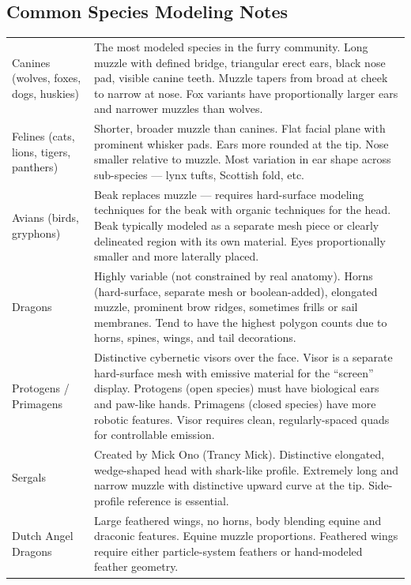 \subsection{Common Species Modeling Notes}
\label{subsec:species-notes}

\begin{center}
\begin{tabularx}{\textwidth}{L{3.2cm}X}
\toprule
{}
 &  \\
\midrule
Canines (wolves, foxes, dogs, huskies) & The most modeled species in the furry community. Long muzzle with defined bridge, triangular erect ears, black nose pad, visible canine teeth. Muzzle tapers from broad at cheek to narrow at nose. Fox variants have proportionally larger ears and narrower muzzles than wolves. \\
Felines (cats, lions, tigers, panthers) & Shorter, broader muzzle than canines. Flat facial plane with prominent whisker pads. Ears more rounded at the tip. Nose smaller relative to muzzle. Most variation in ear shape across sub-species --- lynx tufts, Scottish fold, etc. \\
Avians (birds, gryphons) & Beak replaces muzzle --- requires hard-surface modeling techniques for the beak with organic techniques for the head. Beak typically modeled as a separate mesh piece or clearly delineated region with its own material. Eyes proportionally smaller and more laterally placed. \\
Dragons & Highly variable (not constrained by real anatomy). Horns (hard-surface, separate mesh or boolean-added), elongated muzzle, prominent brow ridges, sometimes frills or sail membranes. Tend to have the highest polygon counts due to horns, spines, wings, and tail decorations. \\
Protogens / Primagens & Distinctive cybernetic visors over the face. Visor is a separate hard-surface mesh with emissive material for the ``screen'' display. Protogens (open species) must have biological ears and paw-like hands. Primagens (closed species) have more robotic features. Visor requires clean, regularly-spaced quads for controllable emission. \\
Sergals & Created by Mick Ono (Trancy Mick). Distinctive elongated, wedge-shaped head with shark-like profile. Extremely long and narrow muzzle with distinctive upward curve at the tip. Side-profile reference is essential. \\
Dutch Angel Dragons & Large feathered wings, no horns, body blending equine and draconic features. Equine muzzle proportions. Feathered wings require either particle-system feathers or hand-modeled feather geometry. \\
\bottomrule
\end{tabularx}
\end{center}


